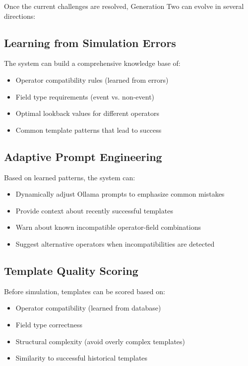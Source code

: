 Once the current challenges are resolved, Generation Two can evolve in several directions:

\subsection{Learning from Simulation Errors}

The system can build a comprehensive knowledge base of:
\begin{itemize}
    \item Operator compatibility rules (learned from errors)
    \item Field type requirements (event vs. non-event)
    \item Optimal lookback values for different operators
    \item Common template patterns that lead to success
\end{itemize}

\subsection{Adaptive Prompt Engineering}

Based on learned patterns, the system can:
\begin{itemize}
    \item Dynamically adjust Ollama prompts to emphasize common mistakes
    \item Provide context about recently successful templates
    \item Warn about known incompatible operator-field combinations
    \item Suggest alternative operators when incompatibilities are detected
\end{itemize}

\subsection{Template Quality Scoring}

Before simulation, templates can be scored based on:
\begin{itemize}
    \item Operator compatibility (learned from database)
    \item Field type correctness
    \item Structural complexity (avoid overly complex templates)
    \item Similarity to successful historical templates
\end{itemize}

